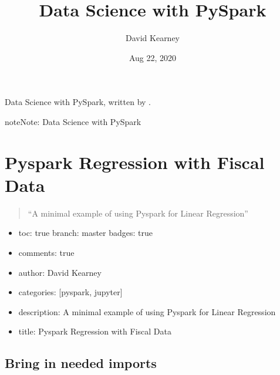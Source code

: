 \documentclass[letterpaper,10pt,english]{sphinxmanual}
\title{Data Science with PySpark}
\date{Aug 22, 2020}
\author{David Kearney}
\begin{document}
\pagestyle{empty}
\sphinxmaketitle
\pagestyle{plain}
\sphinxtableofcontents
\pagestyle{normal}
\label{\detokenize{intro::doc}}


Data Science with PySpark, written by .

\begin{sphinxadmonition}{note}{Note:}
Data Science with PySpark
\end{sphinxadmonition}


\chapter{Pyspark Regression with Fiscal Data}
\label{\detokenize{2020-08-15-Pyspark-Fiscal-Data-Regression:pyspark-regression-with-fiscal-data}}\label{\detokenize{2020-08-15-Pyspark-Fiscal-Data-Regression::doc}}\begin{quote}

“A minimal example of using Pyspark for Linear Regression”
\end{quote}
\begin{itemize}
\item {} 
toc: true\sphinxhyphen{} branch: master\sphinxhyphen{} badges: true

\item {} 
comments: true

\item {} 
author: David Kearney

\item {} 
categories: {[}pyspark, jupyter{]}

\item {} 
description: A minimal example of using Pyspark for Linear Regression

\item {} 
title: Pyspark Regression with Fiscal Data

\end{itemize}


\section{Bring in needed imports}
\label{\detokenize{2020-08-15-Pyspark-Fiscal-Data-Regression:bring-in-needed-imports}}
\begin{sphinxVerbatim}[commandchars=\\\{\}]
   
   
   
\end{sphinxVerbatim}
\end{document}
